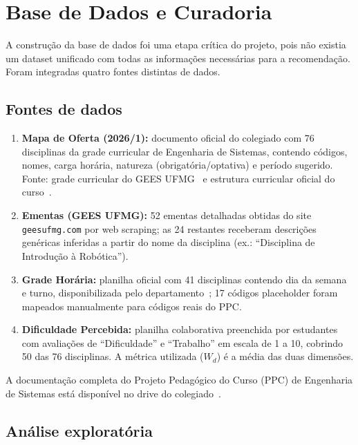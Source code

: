 \documentclass[12pt,a4paper]{article}
\begin{document}
\section{Base de Dados e Curadoria}

A construção da base de dados foi uma etapa crítica do projeto, pois não existia um dataset unificado com todas as informações necessárias para a recomendação. Foram integradas quatro fontes distintas de dados.

\subsection{Fontes de dados}

\begin{enumerate}
    \item \textbf{Mapa de Oferta (2026/1):} documento oficial do colegiado com 76 disciplinas da grade curricular de Engenharia de Sistemas, contendo códigos, nomes, carga horária, natureza (obrigatória/optativa) e período sugerido. Fonte: grade curricular do GEES UFMG~\cite{gees-grade} e estrutura curricular oficial do curso~\cite{ppc-es}.
    \item \textbf{Ementas (GEES UFMG):} 52 ementas detalhadas obtidas do site \texttt{geesufmg.com} por web scraping; as 24 restantes receberam descrições genéricas inferidas a partir do nome da disciplina (ex.: ``Disciplina de Introdução à Robótica'').
    \item \textbf{Grade Horária:} planilha oficial com 41 disciplinas contendo dia da semana e turno, disponibilizada pelo departamento~\cite{drive-horarios}; 17 códigos placeholder foram mapeados manualmente para códigos reais do PPC.
    \item \textbf{Dificuldade Percebida:} planilha colaborativa preenchida por estudantes com avaliações de ``Dificuldade'' e ``Trabalho'' em escala de 1 a 10, cobrindo 50 das 76 disciplinas. A métrica utilizada ($W_d$) é a média das duas dimensões.
\end{enumerate}

A documentação completa do Projeto Pedagógico do Curso (PPC) de Engenharia de Sistemas está disponível no drive do colegiado~\cite{drive-ppc}.

\subsection{Análise exploratória}
\end{document}

